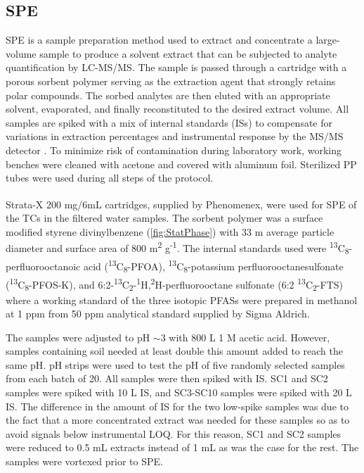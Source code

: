 \subsection{SPE}
SPE is a sample preparation method used to extract and concentrate a large-volume sample to produce a solvent extract that can be subjected to analyte quantification by LC-MS/MS. The sample is passed through a cartridge with a porous sorbent polymer serving as the extraction agent that strongly retains polar compounds. The sorbed analytes are then eluted with an appropriate solvent, evaporated, and finally reconstituted to the desired extract volume. All samples are spiked with a mix of internal standards (ISs) to compensate for variations in extraction percentages and instrumental response by the MS/MS detector \citep{arvaniti2014}. To minimize risk of contamination during laboratory work, working benches were cleaned with acetone and covered with aluminum foil. Sterilized PP tubes were used during all steps of the protocol.

Strata-X\textsuperscript{\textregistered} 200 mg/6mL cartridges, supplied by Phenomenex, were used for SPE of the TCs in the filtered water samples. The sorbent polymer was a surface modified styrene divinylbenzene (\cref{fig:StatPhase}) with 33 \textmu m average particle diameter and surface area of 800 m\textsuperscript{2} g\textsuperscript{-1}. The internal standards used were \textsuperscript{13}C\textsubscript{8}-perfluorooctanoic acid  (\textsuperscript{13}C\textsubscript{8}-PFOA), \textsuperscript{13}C\textsubscript{8}-potassium perfluorooctanesulfonate (\textsuperscript{13}C\textsubscript{8}-PFOS-K), and 6:2-\textsuperscript{13}C\textsubscript{2}-\textsuperscript{1}H,\textsuperscript{2}H-perfluorooctane sulfonate  (6:2 \textsuperscript{13}C\textsubscript{2}-FTS) where a working standard of the three isotopic PFASs were prepared in methanol at 1 ppm from 50 ppm analytical standard supplied by Sigma Aldrich.

The samples were adjusted to pH $\sim$3 with 800 \textmu L 1 M acetic acid. However, samples containing soil needed at least double this amount added to reach the same pH. pH strips were used to test the pH of five randomly selected samples from each batch of 20. All samples were then spiked with IS. SC1 and SC2 samples were spiked with 10 \textmu L IS, and SC3-SC10 samples were spiked with 20 \textmu L IS. The difference in the amount of IS for the two low-spike samples was due to the fact that a more concentrated extract was needed for these samples  so as to avoid signals below instrumental LOQ.  For this reason, SC1 and SC2 samples were reduced to 0.5 mL extracts instead of 1 mL as was the case for the rest. The samples were vortexed prior to SPE.

